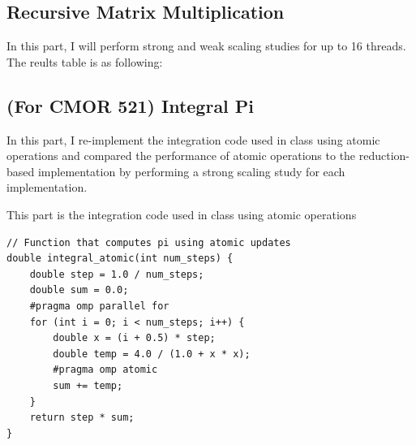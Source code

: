 \documentclass[11pt]{article}
\begin{document}
\subsection{Recursive Matrix Multiplication}

In this part, I will perform strong and weak scaling studies for up to 16 threads. The reults table is as following:
\begin{table}[H]
\centering
{}
\caption{Recursive Matrix Multiplication: Strong and Weak Scaling Results}
\label{tab:recursive_matmul_scaling}
\end{table}

\newpage
\subsection{(For CMOR 521)  Integral Pi}
In this part, I re-implement the integration code used in class using atomic operations and compared the performance of atomic operations to the reduction-based implementation by performing a strong scaling study for each implementation.

This part is the integration code used in class using atomic operations
\begin{lstlisting}[style=C++Style]
// Function that computes pi using atomic updates
double integral_atomic(int num_steps) {
    double step = 1.0 / num_steps;
    double sum = 0.0;
    #pragma omp parallel for
    for (int i = 0; i < num_steps; i++) {
        double x = (i + 0.5) * step;
        double temp = 4.0 / (1.0 + x * x);
        #pragma omp atomic
        sum += temp;
    }
    return step * sum;
}
\end{lstlisting}
\end{document}
